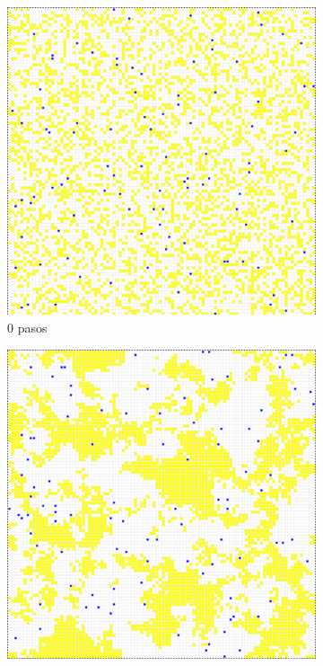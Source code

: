 \documentclass{article}
\begin{document}
\begin{figure}
  \centering
  \begin{subfigure}{0.3\textwidth}
    \includegraphics[width=\textwidth]{imgs/termites-teleport1.png}
    \caption{0 pasos}
  \end{subfigure}
  \begin{subfigure}{0.3\textwidth}
    \includegraphics[width=\textwidth]{imgs/termites-teleport3.png}

\end{subfigure}
\end{figure}
\end{document}

